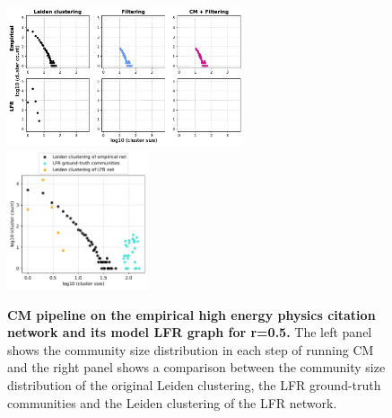 \documentclass[a4paper]{article}   	%
\begin{document}
\begin{figure}[h!]
\centering
\includegraphics[width=0.62\textwidth]{figs/cit_hepph_cm_steps_lfr5.pdf}
\includegraphics[width=0.37\textwidth]{figs/cit_hepph_5_cm_size.pdf}
\caption[CM pipeline on the empirical high energy  physics citation network and its model LFR graph for r=0.5]{\textbf{CM pipeline on the empirical high energy physics citation network and its model LFR graph for r=0.5.} The left panel shows the community size distribution in each step of running CM and the right panel shows a comparison between the community size distribution of the original Leiden clustering, the LFR ground-truth communities and the Leiden clustering of the LFR network.}
\label{fig:hepph-cm-lfr-5}
\end{figure}
\end{document}
